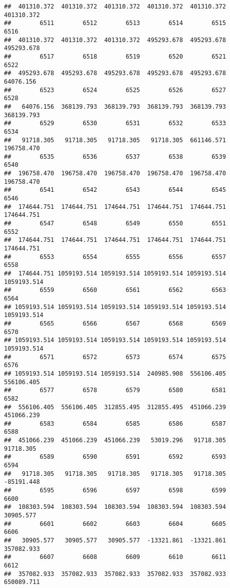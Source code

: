 \documentclass[
]{book}
\begin{document}
\begin{verbatim}
##  401310.372  401310.372  401310.372  401310.372  401310.372  401310.372 
##        6511        6512        6513        6514        6515        6516 
##  401310.372  401310.372  401310.372  495293.678  495293.678  495293.678 
##        6517        6518        6519        6520        6521        6522 
##  495293.678  495293.678  495293.678  495293.678  495293.678   64076.156 
##        6523        6524        6525        6526        6527        6528 
##   64076.156  368139.793  368139.793  368139.793  368139.793  368139.793 
##        6529        6530        6531        6532        6533        6534 
##   91718.305   91718.305   91718.305   91718.305  661146.571  196758.470 
##        6535        6536        6537        6538        6539        6540 
##  196758.470  196758.470  196758.470  196758.470  196758.470  196758.470 
##        6541        6542        6543        6544        6545        6546 
##  174644.751  174644.751  174644.751  174644.751  174644.751  174644.751 
##        6547        6548        6549        6550        6551        6552 
##  174644.751  174644.751  174644.751  174644.751  174644.751  174644.751 
##        6553        6554        6555        6556        6557        6558 
##  174644.751 1059193.514 1059193.514 1059193.514 1059193.514 1059193.514 
##        6559        6560        6561        6562        6563        6564 
## 1059193.514 1059193.514 1059193.514 1059193.514 1059193.514 1059193.514 
##        6565        6566        6567        6568        6569        6570 
## 1059193.514 1059193.514 1059193.514 1059193.514 1059193.514 1059193.514 
##        6571        6572        6573        6574        6575        6576 
## 1059193.514 1059193.514 1059193.514  240985.908  556106.405  556106.405 
##        6577        6578        6579        6580        6581        6582 
##  556106.405  556106.405  312855.495  312855.495  451066.239  451066.239 
##        6583        6584        6585        6586        6587        6588 
##  451066.239  451066.239  451066.239   53019.296   91718.305   91718.305 
##        6589        6590        6591        6592        6593        6594 
##   91718.305   91718.305   91718.305   91718.305   91718.305  -85191.448 
##        6595        6596        6597        6598        6599        6600 
##  108303.594  108303.594  108303.594  108303.594  108303.594   30905.577 
##        6601        6602        6603        6604        6605        6606 
##   30905.577   30905.577   30905.577  -13321.861  -13321.861  357082.933 
##        6607        6608        6609        6610        6611        6612 
##  357082.933  357082.933  357082.933  357082.933  357082.933  650089.711 

\end{verbatim}
\end{document}
